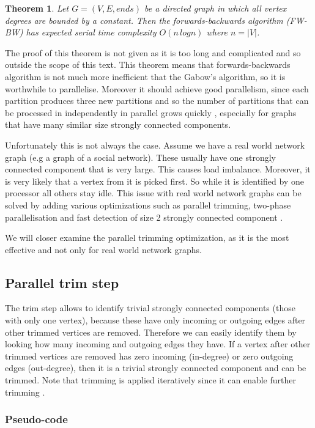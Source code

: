 \documentclass{report}
\theoremstyle{plain}
\newtheorem{theorem}{Theorem}
\theoremstyle{definition}
\theoremstyle{remark}
\numberwithin{definition}{chapter}
\numberwithin{example}{chapter}
\numberwithin{figure}{chapter}
\numberwithin{theorem}{chapter}
\numberwithin{lemma}{chapter}
\begin{document}
\begin{theorem}
Let $G=(V, E, ends)$ be a directed graph in which all vertex degrees are bounded by a constant. Then the forwards-backwards algorithm (FW-BW) has expected serial time complexity $O(n \, logn)$ where $n=|V|$.
\end{theorem}

The proof of this theorem is not given as it is too long and complicated and so outside the scope of this text. This theorem means that forwards-backwards algorithm is not much more inefficient that the Gabow's algorithm, so it is worthwhile to parallelise. Moreover it should achieve good parallelism, since each partition produces three new partitions and so the number of partitions that can be processed in independently in parallel grows quickly \cite{hongtechnical}, especially for graphs that have many similar size strongly connected components.

Unfortunately this is not always the case. Assume we have a real world network graph (e.g a graph of a social network). These usually have one strongly connected component that is very large. This causes load imbalance. Moreover, it is very likely that a vertex from it is picked first. So while it is identified by one processor all others stay idle. This issue with real world network graphs can be solved by adding various optimizations such as parallel trimming, two-phase parallelisation and fast detection of size 2 strongly connected component \cite{hongtechnical}.

We will closer examine the parallel trimming optimization, as it is the most effective and not only for real world network graphs.

\subsection{Parallel trim step}

The trim step allows to identify trivial strongly connected components (those with only one vertex), because these have only incoming or outgoing edges after other trimmed vertices are removed. Therefore we can easily identify them by looking how many incoming and outgoing edges they have. If a vertex after other trimmed vertices are removed has zero incoming (in-degree) or zero outgoing edges (out-degree), then it is a trivial strongly connected component and can be trimmed. Note that trimming is applied iteratively since it can enable further trimming \cite{hongtechnical}.

\subsubsection*{Pseudo-code}
\end{document}
